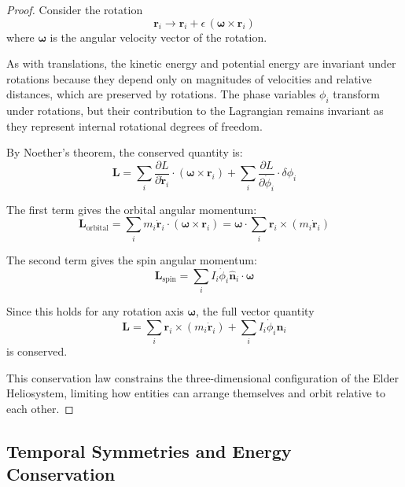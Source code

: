 \begin{proof}
Consider the rotation 
\begin{equation}
\mathbf{r}_i \to \mathbf{r}_i + \epsilon \, (\boldsymbol{\omega} \times \mathbf{r}_i)
\end{equation}
where $\boldsymbol{\omega}$ is the angular velocity vector of the rotation.

As with translations, the kinetic energy and potential energy are invariant under rotations because they depend only on magnitudes of velocities and relative distances, which are preserved by rotations. The phase variables $\phi_i$ transform under rotations, but their contribution to the Lagrangian remains invariant as they represent internal rotational degrees of freedom.

By Noether's theorem, the conserved quantity is:
\begin{equation}
\mathbf{L} = \sum_i \frac{\partial L}{\partial \dot{\mathbf{r}}_i} \cdot (\boldsymbol{\omega} \times \mathbf{r}_i) + \sum_i \frac{\partial L}{\partial \dot{\phi}_i} \cdot \delta\phi_i
\end{equation}

The first term gives the orbital angular momentum:
\begin{equation}
\mathbf{L}_{\text{orbital}} = \sum_i m_i \dot{\mathbf{r}}_i \cdot (\boldsymbol{\omega} \times \mathbf{r}_i) = \boldsymbol{\omega} \cdot \sum_i \mathbf{r}_i \times (m_i \dot{\mathbf{r}}_i)
\end{equation}

The second term gives the spin angular momentum:
\begin{equation}
\mathbf{L}_{\text{spin}} = \sum_i I_i\dot{\phi}_i \hat{\mathbf{n}}_i \cdot \boldsymbol{\omega}
\end{equation}

Since this holds for any rotation axis $\boldsymbol{\omega}$, the full vector quantity 
\begin{equation}
\mathbf{L} = \sum_i \mathbf{r}_i \times (m_i \dot{\mathbf{r}}_i) + \sum_i I_i\dot{\phi}_i \hat{\mathbf{n}}_i
\end{equation}
is conserved.

This conservation law constrains the three-dimensional configuration of the Elder Heliosystem, limiting how entities can arrange themselves and orbit relative to each other.
\end{proof}

\subsection{Temporal Symmetries and Energy Conservation}

